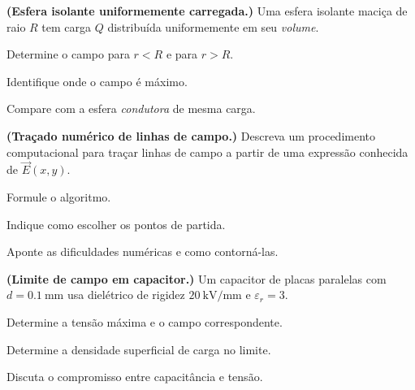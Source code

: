 \begin{questao}[4]{}

\textbf{(Esfera isolante uniformemente carregada.)} Uma esfera isolante maciça
de raio $R$ tem carga $Q$ distribuída uniformemente em seu \emph{volume}.
\begin{itensq}
\item Determine o campo para $r<R$ e para $r>R$.
\item Identifique onde o campo é máximo.
\item Compare com a esfera \emph{condutora} de mesma carga.
\end{itensq}


\end{questao}
\begin{questao}[4]{}

\textbf{(Traçado numérico de linhas de campo.)} Descreva um procedimento
computacional para traçar linhas de campo a partir de uma expressão conhecida de
$\vec E(x,y)$.
\begin{itensq}
\item Formule o algoritmo.
\item Indique como escolher os pontos de partida.
\item Aponte as dificuldades numéricas e como contorná-las.
\end{itensq}


\end{questao}
\begin{questao}[4]{}

\textbf{(Limite de campo em capacitor.)} Um capacitor de placas paralelas com
$d=\SI{0.1}{\milli\meter}$ usa dielétrico de rigidez
$\SI{20}{\kilo\volt\per\milli\meter}$ e $\varepsilon_r=3$.
\begin{itensq}
\item Determine a tensão máxima e o campo correspondente.
\item Determine a densidade superficial de carga no limite.
\item Discuta o compromisso entre capacitância e tensão.
\end{itensq}


\end{questao}
